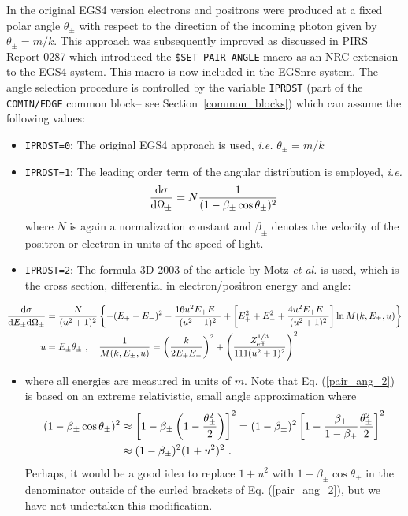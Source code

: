  
In the original EGS4 version electrons and positrons were
produced at a fixed polar angle $\theta_{\pm}$ with respect to the direction
of the incoming photon given by $\theta_{\pm}=m/k$. This approach
was subsequently improved as discussed in PIRS Report 0287
\cite{Bi91} which introduced the {\tt \$SET-PAIR-ANGLE} macro
as an NRC extension to the EGS4 system.
This macro is now included in the EGSnrc system. The angle
selection procedure is controlled by the variable
{\tt IPRDST} (part of the {\tt COMIN/EDGE} common block--
see Section~\ref{common_blocks}) which can assume the following values:
\begin{itemize}
\item[]{\tt IPRDST=0}: The original EGS4 approach is used,
{\em i.e.} $\theta_{\pm}=m/k$
\item[]{\tt IPRDST=1}: The leading order term of the angular distribution
is employed, {\em i.e.}
\begin{equation}
\label{pair_ang1}
{{\rm d} \sigma \over {\rm d} \Omega_\pm} = N
{1 \over (1 - \beta_\pm \cos \theta_\pm)^2}
\end{equation}
where $N$ is again a normalization constant and $\beta_\pm$ denotes
the velocity of the positron or electron in units of the speed of light.
\item[]{\tt IPRDST=2}: The formula 3D-2003 of the article by
Motz {\em et al.} \cite{Mo69} is used, which is the cross section, differential
in electron/positron energy and angle:
\end{itemize}
\begin{equation}
\label{pair_ang_2}
\begin{split}
{{\rm d} \sigma \over {\rm d} E_\pm {\rm d} \Omega_\pm} & =
{N \over (u^2+1)^2 }
\left\{ -(E_+ - E_-)^2 - {16 u^2 E_+ E_- \over (u^2 + 1)^2} +
\left[ E_+^2 + E_-^2 + {4 u^2 E_+ E_- \over (u^2 + 1)^2} \right]
\ln M(k,E_\pm,u) \right\} \\
u & =  E_\pm \theta_\pm~, \quad {1 \over M(k,E_\pm,u)} =
\left({k \over 2 E_+ E_-} \right)^2 + \left( { Z_{\rm eff}^{1/3} \over
111 (u^2 + 1)^2 } \right)^2
\end{split}
\end{equation}
\begin{itemize}
\item[\phantom{\tt IPRDST=2}]
where all energies are measured in units of $m$.
Note that Eq. (\ref{pair_ang_2}) is based on an extreme relativistic,
small angle approximation where
\begin{equation}
\begin{split}
(1 - \beta_\pm \cos \theta_\pm)^2 & \approx
\left[1 - \beta_\pm \left(1 - \frac{\theta_\pm^2}{2}\right) \right]^2
= (1 - \beta_\pm)^2 \left[ 1 - {\beta_\pm \over 1 - \beta_\pm}
\frac{\theta_\pm^2}{2} \right]^2 \\
& \approx  (1 - \beta_\pm)^2 (1 + u^2)^2~.
\end{split}
\end{equation}
Perhaps, it would be a good idea to replace $1+u^2$ with
$1 - \beta_\pm \cos \theta_\pm$ in the denominator outside
of the curled brackets of Eq. (\ref{pair_ang_2}), but
we have not undertaken this modification.
\end{itemize}

